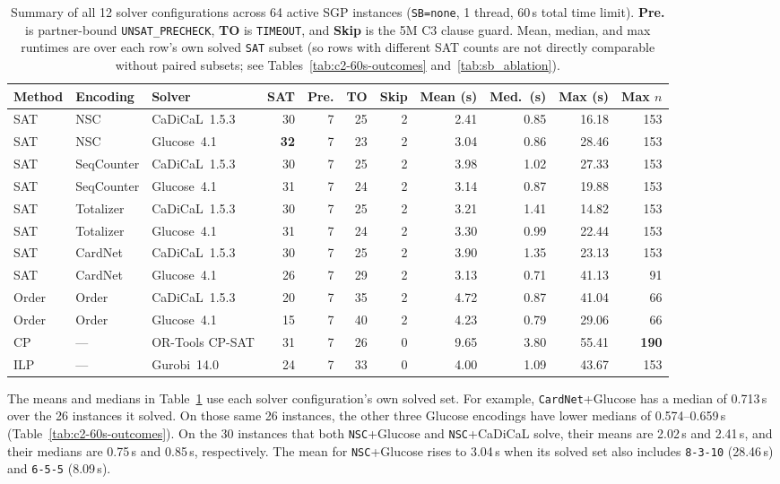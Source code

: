 \documentclass[a4paper,fleqn]{cas-sc}
\begin{document}
\begin{table}[pos=!htb]
\centering\small
\setlength{\tabcolsep}{4pt}
\caption{Summary of all 12 solver configurations across 64 active SGP instances (\texttt{SB=none}, 1 thread, 60\,s total time limit). \textbf{Pre.} is partner-bound \texttt{UNSAT\_PRECHECK}, \textbf{TO} is \texttt{TIMEOUT}, and \textbf{Skip} is the 5M C3 clause guard. Mean, median, and max runtimes are over each row's own solved \texttt{SAT} subset (so rows with different SAT counts are not directly comparable without paired subsets; see Tables~\ref{tab:c2-60s-outcomes} and~\ref{tab:sb_ablation}).}
\label{tab:overall_benchmark}
\begin{tabular}{lllrrrrrrrr}
\toprule
\textbf{Method} & \textbf{Encoding} & \textbf{Solver} & \textbf{SAT} & \textbf{Pre.} & \textbf{TO} & \textbf{Skip} & \textbf{Mean (s)} & \textbf{Med.\ (s)} & \textbf{Max (s)} & \textbf{Max $n$} \\
\midrule
SAT & NSC & CaDiCaL~1.5.3 & 30 & 7 & 25 & 2 & 2.41 & 0.85 & 16.18 & 153 \\
SAT & NSC & Glucose~4.1 & \textbf{32} & 7 & 23 & 2 & 3.04 & 0.86 & 28.46 & 153 \\
SAT & SeqCounter & CaDiCaL~1.5.3 & 30 & 7 & 25 & 2 & 3.98 & 1.02 & 27.33 & 153 \\
SAT & SeqCounter & Glucose~4.1 & 31 & 7 & 24 & 2 & 3.14 & 0.87 & 19.88 & 153 \\
SAT & Totalizer & CaDiCaL~1.5.3 & 30 & 7 & 25 & 2 & 3.21 & 1.41 & 14.82 & 153 \\
SAT & Totalizer & Glucose~4.1 & 31 & 7 & 24 & 2 & 3.30 & 0.99 & 22.44 & 153 \\
SAT & CardNet & CaDiCaL~1.5.3 & 30 & 7 & 25 & 2 & 3.90 & 1.35 & 23.13 & 153 \\
SAT & CardNet & Glucose~4.1 & 26 & 7 & 29 & 2 & 3.13 & 0.71 & 41.13 & 91 \\
\midrule
Order & Order & CaDiCaL~1.5.3 & 20 & 7 & 35 & 2 & 4.72 & 0.87 & 41.04 & 66 \\
Order & Order & Glucose~4.1 & 15 & 7 & 40 & 2 & 4.23 & 0.79 & 29.06 & 66 \\
CP & --- & OR-Tools CP-SAT & 31 & 7 & 26 & 0 & 9.65 & 3.80 & 55.41 & \textbf{190} \\
ILP & --- & Gurobi~14.0 & 24 & 7 & 33 & 0 & 4.00 & 1.09 & 43.67 & 153 \\
\bottomrule
\end{tabular}
\end{table}

The means and medians in Table~\ref{tab:overall_benchmark} use each solver
configuration's own solved set. For example, \texttt{CardNet}+Glucose has a
median of 0.713\,s over the 26 instances it solved. On those same 26 instances,
the other three Glucose encodings have lower medians of 0.574--0.659\,s
(Table~\ref{tab:c2-60s-outcomes}). On the 30 instances that both
\texttt{NSC}+Glucose and \texttt{NSC}+CaDiCaL solve, their means are 2.02\,s
and 2.41\,s, and their medians are 0.75\,s and 0.85\,s, respectively. The
mean for \texttt{NSC}+Glucose rises to 3.04\,s when its solved set also includes
\texttt{8-3-10} (28.46\,s) and \texttt{6-5-5} (8.09\,s).
\end{document}
